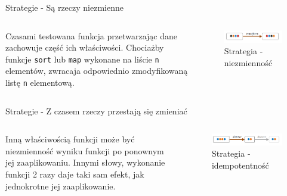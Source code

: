 \begin{frame}{Strategie - Są rzeczy niezmienne}
    \begin{columns}[t]
            Czasami testowana funkcja przetwarzając dane zachowuje część ich właściwości.
            Chociażby funkcje \texttt{sort} lub \texttt{map} wykonane na liście \texttt{n} elementów, zwracaja odpowiednio zmodyfikowaną listę \texttt{n} elementową.
        \centering
        \begin{figure}
            \centering
            \includegraphics[width=1\textwidth]{images/property_invariant.png}
            \caption{Strategia - niezmienność}
            \label{fig:invariant_strategy}
        \end{figure}    
    \end{columns}
\end{frame}


\begin{frame}{Strategie - Z czasem rzeczy przestają się zmieniać}
    \begin{columns}[t]
            Inną właściwością funkcji może być niezmienność wyniku funkcji po ponownym jej zaaplikowaniu. 
            Innymi słowy, wykonanie funkcji 2 razy daje taki sam efekt, jak jednokrotne jej zaaplikowanie.
        \centering
        \begin{figure}
            \centering
            \includegraphics[width=1\textwidth]{images/property_idempotence.png}
            \caption{Strategia - idempotentność}
            \label{fig:independance_strategy}
        \end{figure}    
    \end{columns}
\end{frame}


